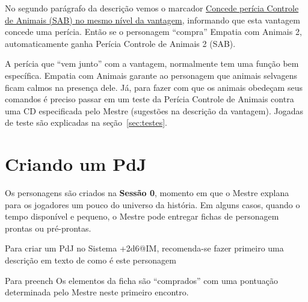 No segundo parágrafo da descrição vemos o marcador \underline{Concede perícia Controle de Animais (SAB) no mesmo nível da vantagem}, informando que esta vantagem concede uma perícia. Então se o personagem ``compra'' Empatia com Animais 2, automaticamente ganha Perícia Controle de Animais 2 (SAB). 

A perícia que ``vem junto'' com a vantagem, normalmente tem uma função bem específica. Empatia com Animais garante ao personagem que animais selvagens ficam calmos na presença dele. Já, para fazer com que os animais obedeçam seus comandos é preciso passar em um teste da Perícia Controle de Animais contra uma CD especificada pelo Mestre (sugestões na descrição da vantagem). Jogadas de teste são explicadas na seção~\ref{sec:testes}.


\section{\label{sec:criapdj}Criando um PdJ}
Os personagens são criados na \textbf{Sessão 0}, momento em que o Mestre explana para os jogadores um pouco do universo da história. Em alguns casos, quando o tempo disponível e pequeno, o Mestre pode entregar fichas de personagem prontas ou pré-prontas.

Para criar um PdJ no Sistema +2d6@IM, recomenda-se fazer primeiro uma descrição em texto de como é este personagem


Para preench
Os elementos da ficha são ``comprados'' com uma pontuação determinada pelo Mestre neste primeiro encontro.
